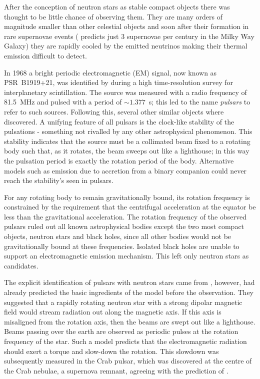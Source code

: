 After the conception of neutron stars as stable compact objects there was
thought to be little chance of observing them. They are many orders of
magnitude smaller than other celestial objects and soon after their formation
in rare supernovae events (\citet{van1991} predicts just 3 supernovae per
century in the Milky Way Galaxy)
they are rapidly cooled by the emitted neutrinos
making their thermal emission difficult to detect.

In 1968 a bright periodic electromagnetic (EM) signal, now known as PSR~B1919+21, was identified
by \citet{Hewish1968} during a high time-resolution survey for interplanetary
scintillation. The source was measured with a radio frequency of 81.5~MHz
and pulsed with a period of $\sim 1.377$~s; this led to the name \emph{pulsars}
to refer to such sources.  Following this, several other similar objects where
discovered. A unifying feature of all pulsars is the clock-like stability of
the pulsations - something not rivalled by any other astrophysical phenomenon.
This stability indicates that the source must be a collimated beam fixed to a
rotating body such that, as it rotates, the beam sweeps out like a lighthouse;
in this way the pulsation period is exactly the rotation period of the body.
Alternative models such as emission due to accretion from a binary companion
could never reach the stability's seen in pulsars.

For any rotating body to remain gravitationally bound, its rotation frequency is
constrained by the requirement that the centrifugal acceleration at the equator
be less than the gravitational acceleration. The rotation frequency of the observed
pulsars ruled out all known astrophysical bodies except the two most compact
objects, neutron stars and black holes, since all other bodies would not be
gravitationally bound at these frequencies. Isolated black holes are unable to
support an electromagnetic emission mechanism. This left only neutron stars
as candidates.

The explicit identification of pulsars with neutron stars came from
\citet{Gold1968}, however, \citet{Pacini1967} had already predicted the basic
ingredients of the model before the observation. They suggested that a rapidly
rotating neutron star with a strong dipolar magnetic field would stream
radiation out along the magnetic axis. If this axis is misaligned from the
rotation axis, then the beams are swept out like a lighthouse. Beams passing
over the earth are observed as periodic pulses at the rotation frequency of the
star.  Such a model predicts that the electromagnetic radiation should exert a
torque and slow-down the rotation.  This slowdown was subsequently measured in
the Crab pulsar, which was discovered at the centre of the Crab nebulae, a
supernova remnant, agreeing with the prediction of \citet{Baade1934}.


